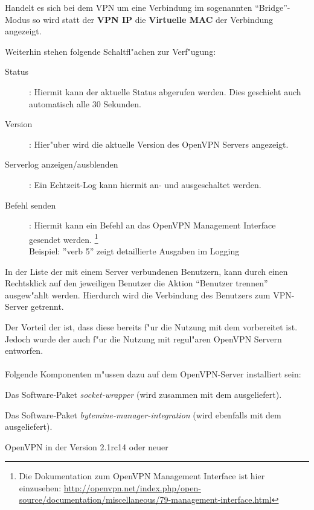 \nl Handelt es sich bei dem VPN um eine Verbindung im sogenannten ``Bridge''-Modus
so wird statt der \textbf{VPN IP} die \textbf{Virtuelle MAC} der Verbindung angezeigt.

\nl Weiterhin stehen folgende Schaltfl"achen zur Verf"ugung:

\begin{description}
	\item [Status]: Hiermit kann der aktuelle Status abgerufen werden. Dies
	    geschieht auch automatisch alle 30 Sekunden.
	\item [Version]: Hier"uber wird die aktuelle Version des OpenVPN Servers
	    angezeigt.
	\item [Serverlog anzeigen/ausblenden]: Ein Echtzeit-Log kann hiermit an- und ausgeschaltet
	    werden.
	\item [Befehl senden]: Hiermit kann ein Befehl an das OpenVPN
	    Management Interface gesendet werden. \footnote{Die Dokumentation zum
	    OpenVPN Management Interface ist hier einzusehen:
	    \url{http://openvpn.net/index.php/open-source/documentation/miscellaneous/79-management-interface.html}}
        \\ Beispiel: ''verb 5'' zeigt detaillierte Ausgaben im Logging
\end{description}



\nl In der Liste der mit einem Server verbundenen Benutzern, kann durch einen
Rechtsklick auf den jeweiligen Benutzer die Aktion ``Benutzer trennen''
ausgew"ahlt
werden. Hierdurch wird die Verbindung des Benutzers zum VPN-Server getrennt.

\newpage
{}


\nl Der Vorteil der \Nboa{} ist,
dass diese bereits f"ur die Nutzung mit dem \Nbm{} vorbereitet ist.
Jedoch wurde der \Nbm{} auch f"ur die
Nutzung mit regul"aren OpenVPN Servern entworfen.\\\\
Folgende Komponenten m"ussen dazu auf dem OpenVPN-Server installiert
sein:

\begin{items}
	\item Das Software-Paket \textsl{socket-wrapper}
		(wird zusammen mit dem \Nbm{} ausgeliefert).
	\item Das Software-Paket \textsl{bytemine-manager-integration}
		(wird ebenfalls mit dem \Nbm{} ausgeliefert).
	\item OpenVPN in der Version 2.1rc14 oder neuer
\end{items}

